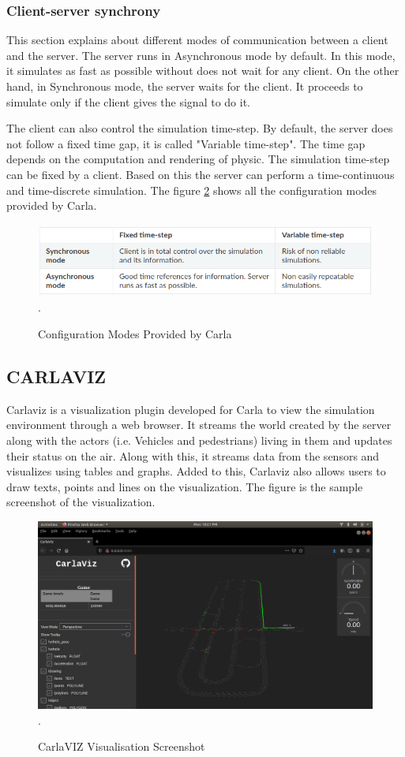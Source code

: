 \subsubsection{Client-server synchrony}
This section explains about different modes of communication between a client and the server. The server runs in Asynchronous mode by default. In this mode, it simulates as fast as possible without does not wait for any client. On the other hand, in Synchronous mode, the server waits for the client. It proceeds to simulate only if the client gives the signal to do it.

The client can also control the simulation time-step. By default, the server does not follow a fixed time gap, it is called "Variable time-step". The time gap depends on the computation and rendering of physic. The simulation time-step can be fixed by a client. Based on this the server can perform a time-continuous and time-discrete simulation. The figure \ref{carm} shows all the configuration modes provided by Carla.

\begin{figure}[h!]
    \centering
    \includegraphics[width=12cm]{Framework/Images/carlaModes.png}.
    \caption{Configuration Modes Provided by Carla \cite{carla_simulator_2020}}
    \label{carm}
\end{figure}

\subsection{CARLAVIZ}
Carlaviz is a visualization plugin developed for Carla to view the simulation environment through a web browser. It streams the world created by the server along with the actors (i.e. Vehicles and pedestrians) living in them and updates their status on the air. Along with this, it streams data from the sensors and visualizes using tables and graphs. Added to this, Carlaviz also allows users to draw texts, points and lines on the visualization. The figure is the sample screenshot of the visualization.

\begin{figure}[h!]
    \centering
    \includegraphics[width=15cm]{Framework/Images/caraVIZ.png}.
    \caption{CarlaVIZ Visualisation Screenshot}
    \label{carm}
\end{figure}
